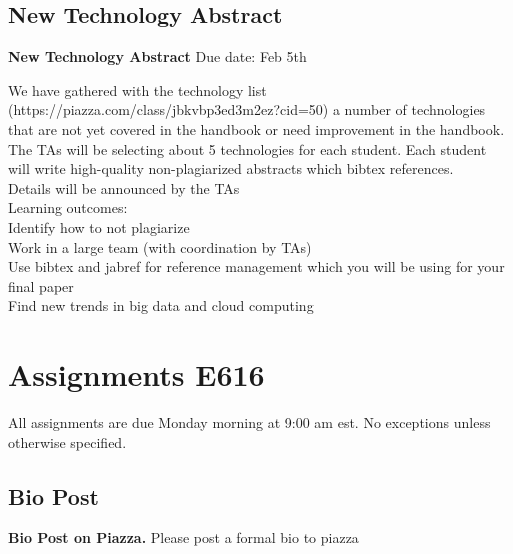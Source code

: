 \subsection{New Technology Abstract}

\begin{exercise} \label{a:i524-new-tech-abstracts}
 
{\bf New Technology Abstract} Due date: Feb 5th

We have gathered with the technology list (https://piazza.com/class/jbkvbp3ed3m2ez?cid=50) a number of technologies that are not yet covered in the handbook or need improvement in the handbook.\\

The TAs will be selecting about 5 technologies for each student. Each student will write high-quality non-plagiarized abstracts which bibtex references.\\
 
Details will be announced by the TAs\\
 
Learning outcomes:\\

\noindent Identify how to not plagiarize\\
Work in a large team (with coordination by TAs)\\
Use bibtex and jabref for reference management which you will be using for your final paper\\
Find new trends in big data and cloud computing\\

\end{exercise}


\section{Assignments E616} \label{s:e616-assignments}

All assignments are due Monday morning at 9:00 am est. No exceptions unless otherwise specified.

\subsection{Bio Post}

\begin{exercise}\label{a:e616-bio-piazza}
{\bf Bio Post on Piazza.} Please post a formal bio to piazza
\end{exercise}

